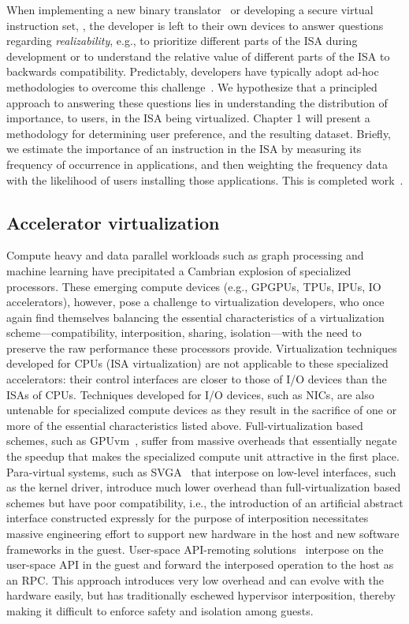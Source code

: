 When implementing a new binary translator~\cite{HVX} or developing a
secure virtual instruction set, , the developer is left to
their own devices to answer questions regarding \emph{realizability}, e.g., to
prioritize different parts of the ISA during development or to understand the
relative value of different parts of the ISA to backwards compatibility.
Predictably, developers have typically adopt ad-hoc methodologies to overcome
this challenge~\cite{bugnion-workstation}. We hypothesize that a principled
approach to answering these questions lies in understanding the distribution
of importance, to users, in the ISA being virtualized. Chapter 1 will present
a methodology for determining user preference, and the resulting dataset.
Briefly, we estimate the importance of an instruction in the ISA by measuring
its frequency of occurrence in applications, and then weighting the frequency
data with the likelihood of users installing those applications. This is
completed work~\cite{x86-systor}.

\subsection{Accelerator virtualization}
Compute heavy and data parallel workloads such as graph processing and machine
learning have precipitated a Cambrian explosion of specialized processors.
These emerging compute devices (e.g., GPGPUs, TPUs, IPUs, IO accelerators),
however, pose a challenge to virtualization developers, who once again find
themselves balancing the essential characteristics of a virtualization
scheme---compatibility, interposition, sharing, isolation---with the need to
preserve the raw performance these processors provide. Virtualization
techniques developed for CPUs (ISA virtualization) are not applicable to these
specialized accelerators: their control interfaces are closer to those of I/O
devices than the ISAs of CPUs.
Techniques developed for I/O devices, such as NICs, are also untenable for
specialized compute devices as they result in the sacrifice of one or more of
the essential characteristics listed above.
Full-virtualization based schemes, such as GPUvm~\cite{suzuki2014gpuvm},
suffer from massive overheads that essentially negate the speedup that makes
the specialized compute unit attractive in the first place.
Para-virtual systems, such as SVGA~\cite{vmware-virtual-gpu} that interpose on
low-level interfaces, such as the kernel driver, introduce much lower overhead
than full-virtualization based schemes but have poor compatibility, i.e., the
introduction of an artificial abstract interface constructed expressly for the
purpose of interposition necessitates massive engineering effort to support
new hardware in the host and new software frameworks in the guest.
User-space API-remoting solutions~\cite{vmCUDA,rCUDA,rCUDAnew} interpose on
the user-space API in the guest and forward the interposed operation to the
host as an RPC. This approach introduces very low overhead and can evolve with
the hardware easily, but has traditionally eschewed hypervisor interposition,
thereby making it difficult to enforce safety and isolation among guests.

